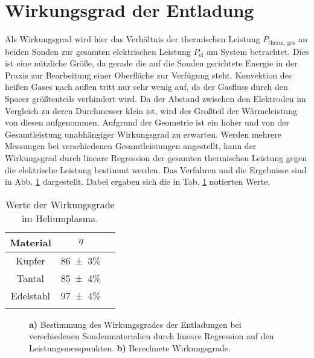 \section{Wirkungsgrad der Entladung}

Als Wirkungsgrad wird hier das Verhältnis der thermischen Leistung $ P_\text{therm, ges} $ an beiden Sonden zur gesamten elektrischen Leistung $ P_\text{el} $ am System betrachtet. Dies ist eine nützliche Größe, da gerade die auf die Sonden gerichtete Energie in der Praxis zur Bearbeitung einer Oberfläche zur Verfügung steht. Konvektion des heißen Gases nach außen tritt nur sehr wenig auf, da der Gasfluss durch den Spacer größtenteils verhindert wird. Da der Abstand zwischen den Elektroden im Vergleich zu deren Durchmesser klein ist, wird der Großteil der Wärmeleistung von diesen aufgenommen. Aufgrund der Geometrie ist ein hoher und von der Gesamtleistung unabhängiger Wirkungsgrad zu erwarten. Werden mehrere Messungen bei verschiedenen Gesamtleistungen angestellt, kann der Wirkungsgrad durch lineare Regression der gesamten thermischen Leistung gegen die elektrische Leistung bestimmt werden. Das Verfahren und die Ergebnisse sind in Abb. \ref{fig:wirkungsgrad} dargestellt. Dabei ergaben sich die in Tab. \ref{tab:eta} notierten Werte.

\begin{table}[thb]
	\centering
	\begin{tabular}{ccr}
		
		{Material} &{$ \eta $} \\
		\toprule
		
		{Kupfer}      & \num{86(3)}\%  \\
		{Tantal}      & \num{85(4)}\%   \\
		{Edelstahl}      & \num{97(4)}\%   \\
		\addlinespace
		
	\end{tabular}
	
	\caption{Werte der Wirkungsgrade im Heliumplasma.}
	\label{tab:eta}
\end{table}

\begin{figure}[h]
	\centering
	
	\caption{\textbf{a)} Bestimmung des Wirkungsgrades der Entladungen bei verschiedenen Sondenmaterialien durch lineare Regression auf den Leistungsmesspunkten. \textbf{b)} Berechnete Wirkungsgrade.}
	\label{fig:wirkungsgrad}
\end{figure}


